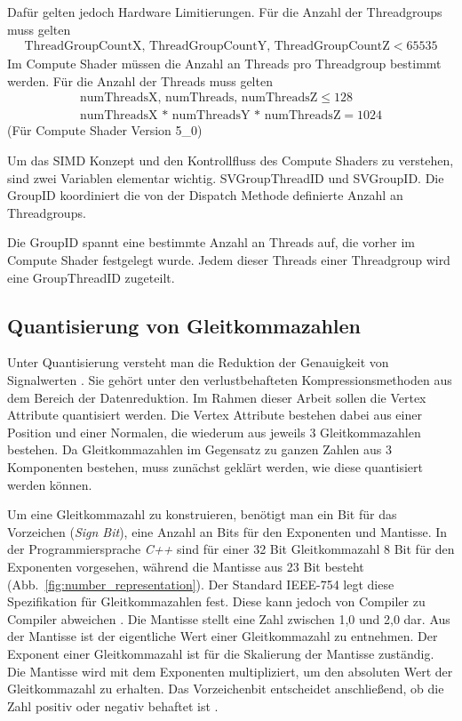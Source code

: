 Dafür gelten jedoch Hardware Limitierungen.
Für die Anzahl der Threadgroups muss gelten
\begin{gather*}
	\text{ThreadGroupCountX, ThreadGroupCountY, ThreadGroupCountZ} < 65535
\end{gather*}
Im Compute Shader müssen die Anzahl an Threads pro Threadgroup bestimmt werden.
Für die Anzahl der Threads muss gelten
\begin{gather*}
	\text{numThreadsX, numThreads, numThreadsZ} \leq 128 \\
	\text{numThreadsX * numThreadsY * numThreadsZ} = 1024
\end{gather*}
(Für Compute Shader Version 5\_0)

Um das SIMD Konzept und den Kontrollfluss des Compute Shaders zu verstehen, sind zwei Variablen elementar wichtig.
SVGroupThreadID und SVGroupID.
Die GroupID koordiniert die von der Dispatch Methode definierte Anzahl an Threadgroups.

Die GroupID spannt eine bestimmte Anzahl an Threads auf, die vorher im Compute Shader festgelegt wurde.
Jedem dieser Threads einer Threadgroup wird eine GroupThreadID zugeteilt.

\subsection{Quantisierung von Gleitkommazahlen}
\label{subsec:quantisierung}
Unter Quantisierung versteht man die Reduktion der Genauigkeit von Signalwerten \cite{Strutz2009}.
Sie gehört unter den verlustbehafteten Kompressionsmethoden aus dem Bereich der Datenreduktion.
Im Rahmen dieser Arbeit sollen die Vertex Attribute quantisiert werden.
Die Vertex Attribute bestehen dabei aus einer Position und einer Normalen, die wiederum aus jeweils 3 Gleitkommazahlen bestehen.
Da Gleitkommazahlen im Gegensatz zu ganzen Zahlen aus 3 Komponenten bestehen, muss zunächst geklärt werden, wie diese quantisiert werden können. \newline

Um eine Gleitkommazahl zu konstruieren, benötigt man ein Bit für das Vorzeichen (\textit{Sign Bit}), eine Anzahl an Bits für den Exponenten und Mantisse.
In der Programmiersprache \textit{C++} sind für einer 32 Bit Gleitkommazahl 8 Bit für den Exponenten vorgesehen, während die Mantisse aus 23 Bit besteht (Abb.~\ref{fig:number_representation}).
Der Standard IEEE-754 legt diese Spezifikation für Gleitkommazahlen fest.
Diese kann jedoch von Compiler zu Compiler abweichen \cite{Microsoft2023}.
Die Mantisse stellt eine Zahl zwischen 1,0 und 2,0 dar.
Aus der Mantisse ist der eigentliche Wert einer Gleitkommazahl zu entnehmen.
Der Exponent einer Gleitkommazahl ist für die Skalierung der Mantisse zuständig.
Die Mantisse wird mit dem Exponenten multipliziert, um den absoluten Wert der Gleitkommazahl zu erhalten.
Das Vorzeichenbit entscheidet anschließend, ob die Zahl positiv oder negativ behaftet ist \cite{Widrow_Kollár_2008}. \newline

